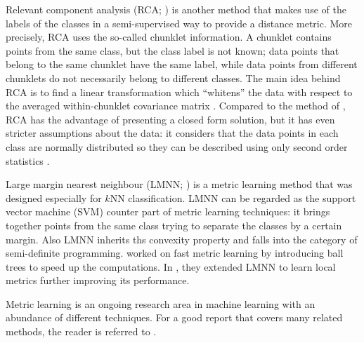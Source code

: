 Relevant component analysis (RCA; \citealp{bar2003, shental2002}) is another method that makes use of the labels of the classes in a semi-supervised way to provide a distance metric. More precisely, RCA uses the so-called chunklet information. A chunklet contains points from the same class, but the class label is not known; data points that belong to the same chunklet have the same label, while data points from different chunklets do not necessarily belong to different classes. The main idea behind RCA is to find a linear transformation which ``whitens'' the data with respect to the averaged within-chunklet covariance matrix \citep{weinberger2009}. Compared to the method of \citet{xing2003}, RCA has the advantage of presenting a closed form solution, but it has even stricter assumptions about the data: it considers that the data points in each class are normally distributed so they can be described using only second order statistics \citep{goldberger2004}.

Large margin nearest neighbour (LMNN; \citealp{weinberger2009}) is a metric learning method that was designed especially for $k$NN classification. LMNN  can be regarded as the support vector machine (SVM) counter part of metric learning techniques: it brings together points from the same class trying to separate the classes by a certain margin. Also LMNN inherits ths convexity property and falls into the category of semi-definite programming. \citet{weinberger2008} worked on fast metric learning by introducing ball trees to speed up the computations. In \citep{weinberger2008}, they extended LMNN to learn local metrics further improving its performance.

Metric learning is an ongoing research area in machine learning with an abundance of different techniques. For a good report that covers many related methods, the reader is referred to \citep{yang2006}.
